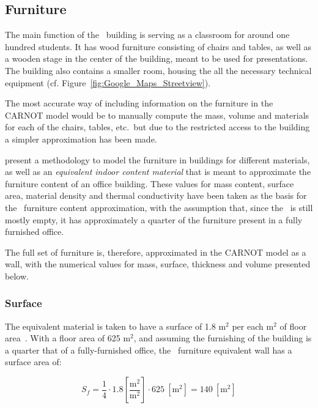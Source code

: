\subsection{Furniture}

The main function of the \pdome\ building is serving as a classroom for around
one hundred students. It has wood furniture consisting of chairs and tables, as
well as a wooden stage in the center of the building, meant to be used for
presentations. The building also contains a smaller room, housing the all the
necessary technical equipment (cf. Figure~\ref{fig:Google_Maps_Streetview}).

The most accurate way of including information on the furniture in the CARNOT
model would be to manually compute the mass, volume and materials for each of
the chairs, tables, etc.\ but due to the restricted access to the building a
simpler approximation has been made.

\textcite{johraNumericalAnalysisImpact2017} present a methodology to model the
furniture in buildings for different materials, as well as an \textit{equivalent
indoor content material} that is meant to approximate the furniture content of
an office building. These values for mass content, surface area, material
density and thermal conductivity have been taken as the basis for the \pdome\
furniture content approximation, with the assumption that, since the \pdome\ is
still mostly empty, it has approximately a quarter of the furniture present in a
fully furnished office.

The full set of furniture is, therefore, approximated in the CARNOT model as a
wall, with the numerical values for mass, surface, thickness and volume
presented below.

\subsubsection*{Surface}

The equivalent material is taken to have a surface of 1.8 $\text{m}^2$ per each
$\text{m}^2$ of floor area~\cite{johraNumericalAnalysisImpact2017}. With a floor
area of 625 $\text{m}^2$, and assuming the furnishing of the building is a
quarter that of a fully-furnished office, the \pdome\ furniture equivalent wall
has a surface area of:

\begin{equation}
    S_f = \frac{1}{4} \cdot 1.8 \left[\frac{\text{m}^2}{\text{m}^2}\right]
    \cdot 625\ \left[\text{m}^2\right] = 140\ \left[\text{m}^2\right]
\end{equation}

